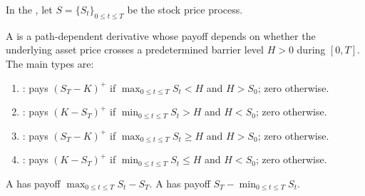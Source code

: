 \begin{definition} \label{definition:barrier_options_and_lookback_options}
In the , let $S = \{S_t\}_{0 \leq t \leq T}$ be the stock price process.

A  is a path-dependent derivative whose payoff depends on whether the underlying asset price crosses a predetermined barrier level $H > 0$ during $[0, T]$. The main types are:

\begin{enumerate}
    \item {}: pays $(S_T - K)^+$ if $\max_{0 \leq t \leq T} S_t < H$ and $H > S_0$; zero otherwise.
    \item {}: pays $(K - S_T)^+$ if $\min_{0 \leq t \leq T} S_t > H$ and $H < S_0$; zero otherwise.
    \item {}: pays $(S_T - K)^+$ if $\max_{0 \leq t \leq T} S_t \geq H$ and $H > S_0$; zero otherwise.
    \item {}: pays $(K - S_T)^+$ if $\min_{0 \leq t \leq T} S_t \leq H$ and $H < S_0$; zero otherwise.
\end{enumerate}

A  has payoff $\max_{0 \leq t \leq T} S_t - S_T$. A  has payoff $S_T - \min_{0 \leq t \leq T} S_t$.
\end{definition}

